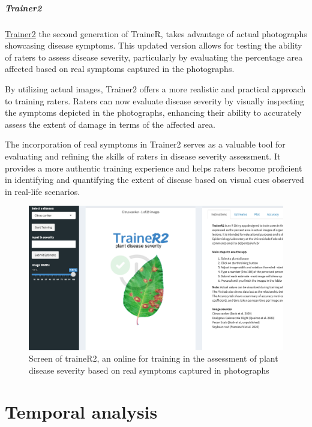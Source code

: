 \documentclass[
  letterpaper,
]{book}
\begin{document}
\hypertarget{trainer2}{%
\subsubsection{Trainer2}\label{trainer2}}

\href{https://delponte.shinyapps.io/traineR2/}{Trainer2} the second
generation of TraineR, takes advantage of actual photographs showcasing
disease symptoms. This updated version allows for testing the ability of
raters to assess disease severity, particularly by evaluating the
percentage area affected based on real symptoms captured in the
photographs.

By utilizing actual images, Trainer2 offers a more realistic and
practical approach to training raters. Raters can now evaluate disease
severity by visually inspecting the symptoms depicted in the
photographs, enhancing their ability to accurately assess the extent of
damage in terms of the affected area.

The incorporation of real symptoms in Trainer2 serves as a valuable tool
for evaluating and refining the skills of raters in disease severity
assessment. It provides a more authentic training experience and helps
raters become proficient in identifying and quantifying the extent of
disease based on visual cues observed in real-life scenarios.

\begin{figure}

{\centering \includegraphics[width=4.47917in,height=\textheight]{imgs/trainer2.png}

}

\caption{\label{fig-trainer2}Screen of traineR2, an online for training
in the assessment of plant disease severity based on real symptoms
captured in photographs}

\end{figure}

\part{Temporal analysis}
\end{document}
